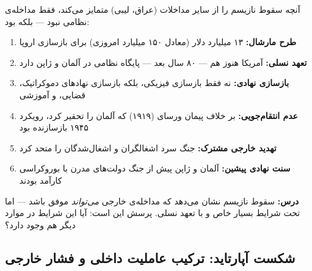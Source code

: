 آنچه سقوط نازیسم را از سایر مداخلات (عراق، لیبی) متمایز می‌کند، فقط مداخله‌ی نظامی نبود — بلکه  بود:

\begin{tcolorbox}[successbox, title={عوامل موفقیت: بازسازی آلمان و ژاپن}]
\begin{enumerate}
\item \textbf{طرح مارشال:} ۱۳ میلیارد دلار (معادل ۱۵۰ میلیارد امروزی) برای بازسازی اروپا
\item \textbf{تعهد نسلی:} آمریکا هنوز هم — ۸۰ سال بعد — پایگاه نظامی در آلمان و ژاپن دارد
\item \textbf{بازسازی نهادی:} نه فقط بازسازی فیزیکی، بلکه بازسازی نهادهای دموکراتیک، قضایی، و آموزشی
\item \textbf{عدم انتقام‌جویی:} بر خلاف پیمان ورسای (۱۹۱۹) که آلمان را تحقیر کرد، رویکرد ۱۹۴۵ بازسازنده بود
\item \textbf{تهدید خارجی مشترک:} جنگ سرد اشغالگران و اشغال‌شدگان را متحد کرد
\item \textbf{سنت نهادی پیشین:} آلمان و ژاپن پیش از جنگ دولت‌های مدرن با بوروکراسی کارآمد بودند
\end{enumerate}
\end{tcolorbox}

\textbf{درس:} سقوط نازیسم نشان می‌دهد که مداخله‌ی خارجی \textit{می‌تواند} موفق باشد — اما تحت شرایط بسیار خاص و با تعهد نسلی. پرسش این است: آیا این شرایط در موارد دیگر هم وجود دارد؟

\subsection{شکست آپارتاید: ترکیب عاملیت داخلی و فشار خارجی}
\label{subsec:ch15-apartheid}

